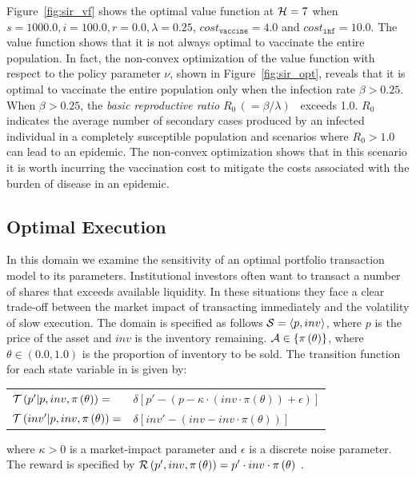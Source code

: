 Figure~\ref{fig:sir_vf} shows the optimal value function at {\footnotesize$ \mathcal{H} = 7 $} when {\footnotesize $ s = 1000.0, i = 100.0, r = 0.0, \lambda = 0.25 $}, {\footnotesize $ cost_{\mathtt{vaccine}} = 4.0$} and {\footnotesize $ cost_{\mathtt{inf}} = 10.0 $}. The value function shows that it is not always optimal to vaccinate the entire population. In fact, the non-convex optimization of the value function with respect to the policy parameter {\footnotesize $ \nu $}, shown in Figure~\ref{fig:sir_opt}, reveals that it is optimal to vaccinate the entire population only when the infection rate {\footnotesize $ \beta > 0.25 $}. When  {\footnotesize $ \beta > 0.25 $}, the \textit{basic reproductive ratio} {\footnotesize $ R_0 \,(= \beta/\lambda)$}~\parencite{Heffernan_2005} exceeds 1.0. {\footnotesize $ R_0$} indicates the average number of secondary cases produced by an infected individual in a completely susceptible population and scenarios where {\footnotesize $R_0 > 1.0$} can lead to an epidemic. The non-convex optimization shows that in this scenario it is worth incurring the vaccination cost to mitigate the costs associated with the burden of disease in an epidemic.

\subsection{Optimal Execution}
\label{sec:results_oe}

In this domain we examine the sensitivity of an optimal portfolio transaction model to its parameters. Institutional investors often want to transact a number of shares that exceeds available liquidity. In these situations they face a clear trade-off between the market impact of transacting immediately and the volatility of slow execution. The domain is specified as follows {\footnotesize $ \mathcal{S} = \left\langle p, inv \right\rangle$}, where $ p $ is the price of the asset and $ inv $ is the inventory remaining. {\footnotesize $ \mathcal{A} \in \left\lbrace \pi\left( \theta \right) \right\rbrace$}, where {\footnotesize $ \theta \in \left( 0.0, 1.0\right)$} is the proportion of inventory to be sold. The transition function {\footnotesize \Transition} for each state variable in {\footnotesize \State} is given by:
{\footnotesize 
    \abovedisplayskip=5pt
    \belowdisplayskip=0pt
    \renewcommand{\arraystretch}{1.5}
    \begin{tabular}{ll}
        $\mathcal{T}\left( p' | p, inv, \pi\left( \theta \right) \right) =$ & $ \delta \left[ p' - (p - \kappa \cdot (inv \cdot \pi\left( \theta \right)) + \epsilon) \right] $ \\
        $\mathcal{T}\left( inv' | p, inv, \pi\left( \theta \right) \right) =$ & $\delta \left[ inv' - (inv - inv \cdot \pi\left( \theta \right)) \right] $ \\
    \end{tabular}
}%
where {\footnotesize $ \kappa > 0$} is a market-impact parameter and {\footnotesize $ \epsilon $} is a discrete noise parameter. The reward is specified by {\footnotesize $ \mathcal{R}\left(p', inv, \pi\left( \theta \right) \right) = p' \cdot inv \cdot \pi\left( \theta \right)$ }. 

